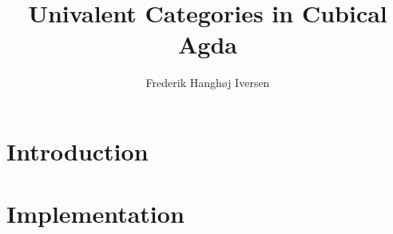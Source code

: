 \documentclass[a4paper]{report}
\title{Univalent Categories in Cubical Agda}
\author{Frederik Hanghøj Iversen}
\subtitle{}
\begin{document}
\maketitle
\tableofcontents
%
\chapter{Introduction}


\chapter{Implementation}



\nocite{cubical-demo}
\nocite{coquand-2013}


\begin{appendices}
\setcounter{page}{1}
\end{appendices}
\end{document}
